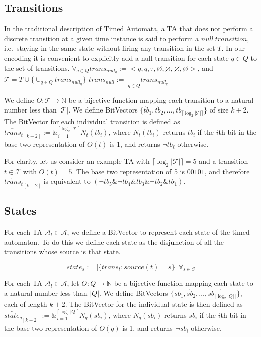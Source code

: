 \documentclass[a4paper,12pt]{article}
\newcommand*\BitAnd{\mathbin{\&}}
\newcommand*\BitOr{\mathbin{|}}
\begin{document}
\subsection{Transitions}\label{encoding-transitions}

In the traditional description of Timed Automata, a TA that does not perform a
discrete transition at a given time instance is said to perform a \(null\
transition\), i.e.\ staying in the same state without firing any transition in
the set \(T\). In our encoding it is convenient to explicitly add a null
transition for each state \(q \in Q\) to the set of transitions. \(\forall_{q
\in Q} trans_{null_q} := {<}q, q, \tau, \varnothing, \varnothing, \varnothing,
\varnothing {>}\), and \(\mathcal{T} = T \cup \{\cup_{q \in Q}
trans_{null_q}\}\) \(trans_{null} := \BitOr_{q \in Q} trans_{null_q}\)

We define \(O: \mathcal{T} \rightarrow \mathbb{N}\) be a bijective
function mapping each transition to a natural number less than
\(|\mathcal{T}|\). We define BitVectors \(\{\overleftarrow{tb_1},
\overleftarrow{tb_2}, \ldots, \overleftarrow{tb_{\lceil
\log_2 |\mathcal{T}|\rceil}}\}\) of size \(k+2\). The BitVector for each
individual transition is defined as \(\overleftarrow{trans_t}_{[k+2]} :=
\BitAnd_{i=1}^{\lceil\log_2 |\mathcal{T}|\rceil} N_t(tb_i)\), where \(N_t(tb_i)\)
returns \(tb_i\) if the \(i\)th bit in the base two representation of \(O(t)\)
is 1, and returns \(\neg tb_i\) otherwise.

For clarity, let us consider an example TA with
\(\lceil\log_2 |\mathcal{T}|\rceil = 5\) and a transition \(t \in \mathcal{T}\)
with \(O(t) = 5\). The base two representation of 5 is \(00101\), and therefore
\(\overleftarrow{trans_t}_{[k+2]}\) is equivalent to \((\neg tb_5 \BitAnd
\neg tb_4 \BitAnd tb_3 \BitAnd \neg tb_2 \BitAnd tb_1)\).

\subsection{States}\label{encoding-states}

For each TA \(\mathcal{A}_l \in \mathcal{A}\), we define a BitVector to
represent each state of the timed automaton. To do this we define each state as
the disjunction of all the transitions whose source is that state.

\[state_s := \BitOr\{trans_t : source(t) = s\}\ \ \forall_{s \in S}\]

For each TA \(\mathcal{A}_l \in \mathcal{A}\), let \(O: Q \rightarrow
\mathbb{N}\) be a bijective function mapping each state to a natural number less
than \(|Q|\). We define BitVectors \(\{\overleftarrow{sb_1},
\overleftarrow{sb_2}, \ldots, \overleftarrow{sb_{\lceil\log_2 |Q|\rceil}}\}\),
each of length \(k+2\). The BitVector for the individual state is then defined
as \(\overleftarrow{state_q}_{[k+2]} := \BitAnd_{i=1}^{\lceil\log_2 |Q|\rceil}
N_q(sb_i)\), where \(N_q(sb_i)\) returns \(sb_i\) if the \(i\)th bit in the base
two representation of \(O(q)\) is 1, and returns \(\neg sb_i\) otherwise.
\end{document}
